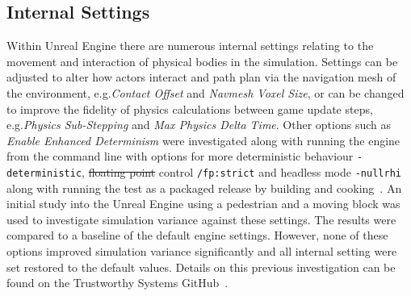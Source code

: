 \documentclass[letterpaper, 10 pt, journal, twoside]{IEEEtran}
\providecommand{\DIFaddtex}[1]{{\protect\color{blue}\uwave{#1}}} %
\providecommand{\DIFdeltex}[1]{{\protect\color{red}\sout{#1}}}                      %
\providecommand{\DIFaddbegin}{} %
\providecommand{\DIFaddend}{} %
\providecommand{\DIFdelbegin}{} %
\providecommand{\DIFdelend}{} %
\providecommand{\DIFadd}[1]{\texorpdfstring{\DIFaddtex{#1}}{#1}} %
\providecommand{\DIFdel}[1]{\texorpdfstring{\DIFdeltex{#1}}{}} %
\begin{document}


\subsection{Internal Settings}

Within Unreal Engine there are numerous internal settings relating to the movement and interaction of physical bodies in the simulation. Settings can be adjusted to alter how actors interact and path plan via the navigation mesh of the environment, e.g.\DIFaddbegin \DIFadd{\ }\DIFaddend \textit{Contact Offset} and \textit{Navmesh Voxel Size}, or can be changed to improve the fidelity of physics calculations between game update steps, e.g.\DIFaddbegin \DIFadd{\ }\DIFaddend \textit{Physics Sub-Stepping} and \textit{Max Physics Delta Time}. Other options such as \textit{Enable Enhanced Determinism} were investigated along with running the engine from the command line with options for more deterministic behaviour \texttt{-deterministic}, \DIFdelbegin \DIFdel{floating point }\DIFdelend \DIFaddbegin \DIFadd{floating-point }\DIFaddend control \texttt{/fp:strict} and headless mode \texttt{-nullrhi} along with running the test as a packaged release by building and cooking~\cite{releasing_project}.
An initial study into the Unreal Engine using a pedestrian and a moving block was used to investigate simulation variance against these settings. The results were compared to a baseline of the default engine settings. 
%
However, none of these options improved simulation variance significantly and all internal setting were set restored to the default values. Details on this previous investigation can be found on the Trustworthy Systems GitHub~\cite{TSLUnrealEngineTesting}. 
\end{document}
